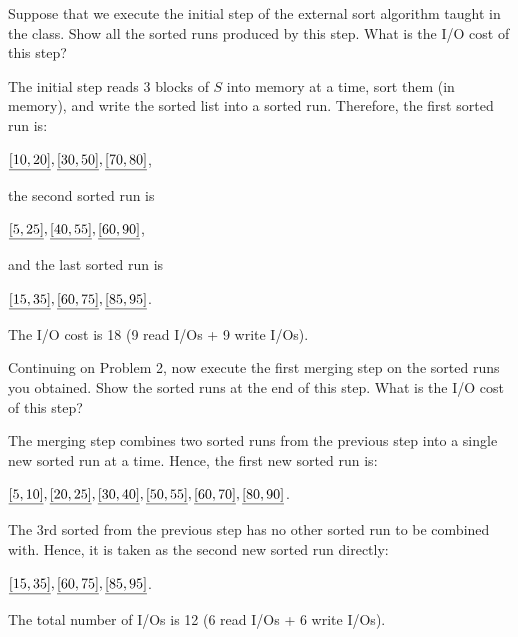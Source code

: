 \vgap

\noindent Suppose that we execute the initial step of the external sort algorithm taught in the class. Show all the sorted runs produced by this step. What is the I/O cost of this step?

\begin{sol}

 The initial step reads 3 blocks of $S$ into memory at a time, sort them (in memory), and write the sorted list into a sorted run. Therefore, the first sorted run is:

\begin{center}
    $\uline{[10, 20]}, \uline{[30, 50]}, \uline{[70, 80]}$,
\end{center}

\noindent the second sorted run is

\begin{center}
    $\uline{[5, 25]}, \uline{[40, 55]}, \uline{[60, 90]}$,
\end{center}

\noindent and the last sorted run is

\begin{center}
    $\uline{[15, 35]}, \uline{[60, 75]}, \uline{[85, 95]}$.
\end{center}

The I/O cost is 18 (9 read I/Os + 9 write I/Os).

\end{sol}


 Continuing on Problem 2, now execute the first merging step on the sorted runs you obtained. Show the sorted runs at the end of this step. What is the I/O cost of this step?

\begin{sol}
 The merging step combines two sorted runs from the previous step into a single new sorted run at a time. Hence, the first new sorted run is:

\begin{center}
    $\uline{[5, 10]}, \uline{[20, 25]}, \uline{[30, 40]}, \uline{[50, 55]}, \uline{[60, 70]}, \uline{[80, 90]}$.
\end{center}

\noindent The 3rd sorted from the previous step has no other sorted run to be combined with. Hence, it is taken as the second new sorted run directly:

\begin{center}
    $\uline{[15, 35]}, \uline{[60, 75]}, \uline{[85, 95]}$.
\end{center}

The total number of I/Os is 12 (6 read I/Os + 6 write I/Os).

\end{sol}


